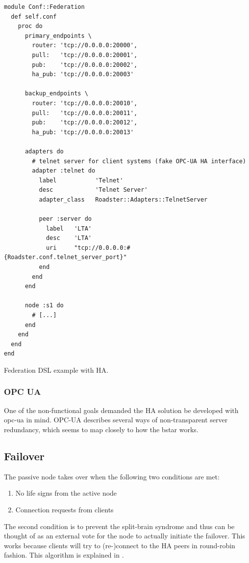\begin{listing}
	\begin{verbatim}
module Conf::Federation
  def self.conf
    proc do
      primary_endpoints \
        router: 'tcp://0.0.0.0:20000',
        pull:   'tcp://0.0.0.0:20001',
        pub:    'tcp://0.0.0.0:20002',
        ha_pub: 'tcp://0.0.0.0:20003'

      backup_endpoints \
        router: 'tcp://0.0.0.0:20010',
        pull:   'tcp://0.0.0.0:20011',
        pub:    'tcp://0.0.0.0:20012',
        ha_pub: 'tcp://0.0.0.0:20013'

      adapters do
        # telnet server for client systems (fake OPC-UA HA interface)
        adapter :telnet do
          label           'Telnet'
          desc            'Telnet Server'
          adapter_class   Roadster::Adapters::TelnetServer

          peer :server do
            label   'LTA'
            desc    'LTA'
            uri     "tcp://0.0.0.0:#{Roadster.conf.telnet_server_port}"
          end
        end
      end

      node :s1 do
        # [...]
      end
    end
  end
end
	\end{verbatim}
	\caption{Federation DSL example with HA.}
	\label{lst:dsl:topo:with-ha}
\end{listing}



\subsubsection{OPC UA}
One of the non-functional goals demanded the HA solution be developed with
\gls{opc-ua} in mind. OPC-UA describes several ways of non-transparent server
redundancy, which seems to map closely to how the \gls{bstar} works.

\subsection{Failover}
The passive node takes over when the following two conditions are met:

\begin{enumerate}
\item No life signs from the active node
\item Connection requests from clients
\end{enumerate}

The second condition is to prevent the split-brain syndrome and thus can be
thought of as an external vote for the node to actually initiate the failover.
This works because clients will try to (re-)connect to the HA peers in
round-robin fashion.  This algorithm is explained in \cite[Chapter 4 - Reliable
Request-Reply Patterns, Client-Side Reliability (Lazy Pirate
Pattern)]{zmq:zguide}.

